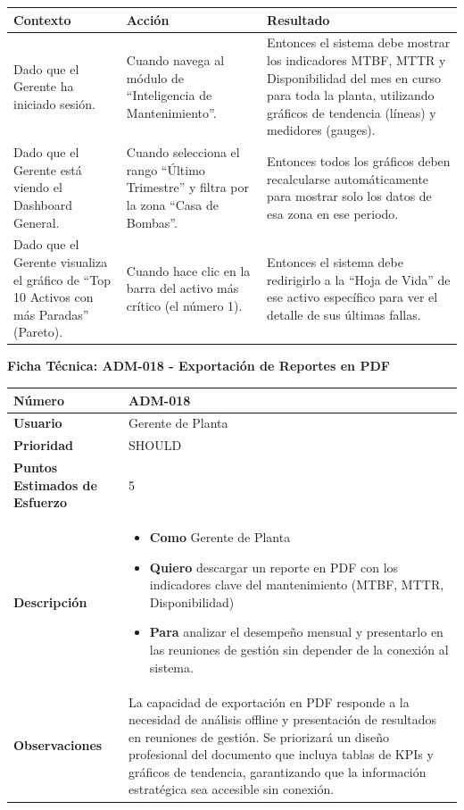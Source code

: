 \footnotesize\begin{longtable}{|p{0.28\textwidth}|p{0.32\textwidth}|p{0.34\textwidth}|}\hline
\textbf{Contexto} & \textbf{Acción} & \textbf{Resultado} \\ \hline
\parbox[t]{\linewidth}{Dado que el Gerente ha iniciado sesión.} & \parbox[t]{\linewidth}{Cuando navega al módulo de ``Inteligencia de Mantenimiento''.} & \parbox[t]{\linewidth}{Entonces el sistema debe mostrar los indicadores MTBF, MTTR y Disponibilidad del mes en curso para toda la planta, utilizando gráficos de tendencia (líneas) y medidores (gauges).} \\ \hline
\parbox[t]{\linewidth}{Dado que el Gerente está viendo el Dashboard General.} & \parbox[t]{\linewidth}{Cuando selecciona el rango ``Último Trimestre'' y filtra por la zona ``Casa de Bombas''.} & \parbox[t]{\linewidth}{Entonces todos los gráficos deben recalcularse automáticamente para mostrar solo los datos de esa zona en ese periodo.} \\ \hline
\parbox[t]{\linewidth}{Dado que el Gerente visualiza el gráfico de ``Top 10 Activos con más Paradas'' (Pareto).} & \parbox[t]{\linewidth}{Cuando hace clic en la barra del activo más crítico (el número 1).} & \parbox[t]{\linewidth}{Entonces el sistema debe redirigirlo a la ``Hoja de Vida'' de ese activo específico para ver el detalle de sus últimas fallas.} \\ \hline
\end{longtable}\normalsize
\vspace{1em}
\noindent\textbf{Ficha Técnica: ADM-018 - Exportación de Reportes en PDF}
\footnotesize\setlength{\tabcolsep}{4pt}\renewcommand{\arraystretch}{1.2}
\begin{longtable}{|p{0.21\textwidth}|p{0.74\textwidth}|}\hline
\textbf{Número} & ADM-018 \\ \hline
\textbf{Usuario} & Gerente de Planta \\ \hline
\textbf{Prioridad} & SHOULD \\ \hline
\textbf{Puntos Estimados de Esfuerzo} & 5 \\ \hline
\textbf{Descripción} & \parbox[t]{\linewidth}{\vspace{2pt}\begin{itemize}[leftmargin=1.5em, nosep, topsep=0pt]
\item \textbf{Como} Gerente de Planta
\item \textbf{Quiero} descargar un reporte en PDF con los indicadores clave del mantenimiento (MTBF, MTTR, Disponibilidad)
\item \textbf{Para} analizar el desempeño mensual y presentarlo en las reuniones de gestión sin depender de la conexión al sistema.
\end{itemize}\vspace{2pt}} \\ \hline
\textbf{Observaciones} & La capacidad de exportación en PDF responde a la necesidad de análisis offline y presentación de resultados en reuniones de gestión. Se priorizará un diseño profesional del documento que incluya tablas de KPIs y gráficos de tendencia, garantizando que la información estratégica sea accesible sin conexión. \\ \hline
\end{longtable}\normalsize
